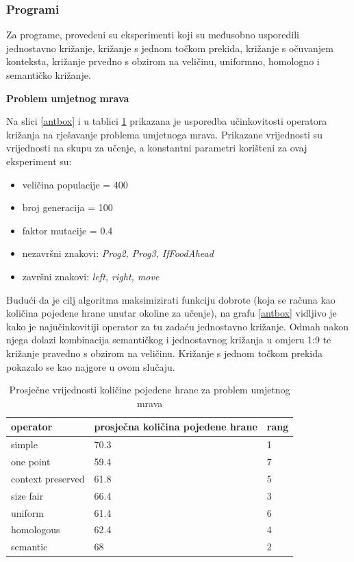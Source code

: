 \subsubsection{Programi}

Za programe, provedeni su eksperimenti koji su međusobno usporedili jednostavno križanje, križanje s jednom točkom prekida, križanje s očuvanjem konteksta, križanje prvedno s obzirom na veličinu, uniformno, homologno i semantičko križanje.

\textbf{Problem umjetnog mrava}

Na slici \ref{antbox} i u tablici \ref{anttable} prikazana je usporedba učinkovitosti operatora križanja na rješavanje problema umjetnoga mrava. Prikazane vrijednosti su vrijednosti na skupu za učenje, a konstantni parametri korišteni za ovaj eksperiment su:
\begin{itemize}
\item{veličina populacije = 400}
\item{broj generacija = 100}
\item{faktor mutacije = 0.4}
\item{nezavršni znakovi: \textit{Prog2, Prog3, IfFoodAhead}}
\item{završni znakovi: \textit{left, right, move}}
\end{itemize} 

Budući da je cilj algoritma maksimizirati funkciju dobrote (koja se računa kao količina pojedene hrane unutar okoline za učenje), na grafu \ref{antbox} vidljivo je kako je najučinkovitiji operator za tu zadaću jednostavno križanje. Odmah nakon njega dolazi kombinacija semantičkog i jednostavnog križanja u omjeru 1:9 te križanje pravedno s obzirom na veličinu. Križanje s jednom točkom prekida pokazalo se kao najgore u ovom slučaju.

\begin{table}[H]
 	\centering

    \begin{tabular}{| l | l | l |}
    \hline
    \textbf{operator} & \textbf{prosječna količina pojedene hrane} & \textbf{rang}\\ \hline
    simple & 70.3 & 1\\ \hline
    one point & 59.4 & 7\\ \hline
    context preserved & 61.8 & 5\\ \hline
    size fair & 66.4 & 3\\ \hline
    uniform & 61.4 & 6\\ \hline
    homologous & 62.4 & 4\\ \hline
    semantic & 68 & 2\\ \hline
    \end{tabular}
    
    \caption{Prosječne vrijednosti količine pojedene hrane za problem umjetnog mrava}
    \label{anttable}
\end{table}

